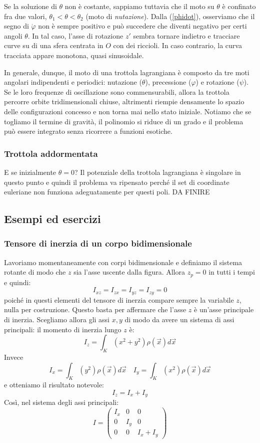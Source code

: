 \documentclass[a4paper,openany]{article}
\begin{document}
	
	Se la soluzione di $\theta$ non è costante, sappiamo tuttavia che il moto su $\theta$ è confinato fra due valori, $\theta_1<\theta <\theta_2$ (moto di \textit{nutazione}). Dalla (\ref{phidot}), osserviamo che il segno di $\dot{\varphi}$ non è sempre positivo e può succedere che diventi negativo per certi angoli $\theta$. In tal caso, l'asse di rotazione $z'$ sembra tornare indietro e tracciare curve su di una sfera centrata in $O$ con dei riccioli. In caso contrario, la curva tracciata appare monotona, quasi sinusoidale. 
	
	In generale, dunque, il moto di una trottola lagrangiana è composto da tre moti angolari indipendenti e periodici: nutazione ($\theta$), precessione ($\varphi$) e rotazione ($\psi$). Se le loro frequenze di oscillazione sono commensurabili, allora la trottola percorre orbite tridimensionali chiuse, altrimenti riempie densamente lo spazio delle configurazioni concesso e non torna mai nello stato iniziale.
	Notiamo che se togliamo il termine di gravità, il polinomio si riduce di un grado e il problema può essere integrato senza ricorrere a funzioni esotiche. 
	\subsubsection{Trottola addormentata}
	E se inizialmente $\theta = 0$? Il potenziale della trottola lagrangiana è singolare in questo punto e quindi il problema va ripensato perché il set di coordinate euleriane non funziona adeguatamente per questi poli. 
	DA FINIRE 
	\newpage 
	\subsection{Esempi ed esercizi}
	\subsubsection{Tensore di inerzia di un corpo bidimensionale}
	Lavoriamo momentaneamente con corpi bidimensionale e definiamo il sistema rotante di modo che $z$ sia l'asse uscente dalla figura. Allora $z_{p} = 0$ in tutti i tempi e quindi:
	$$
	I_{xz} = I_{zx} = I_{yz} = I_{zy} = 0
	$$  
	poiché in questi elementi del tensore di inerzia compare sempre la variabile $z$, nulla per costruzione. Questo basta per affermare che l'asse $z$ è un'asse principale di inerzia. Scegliamo allora gli assi $x,y$ di modo da avere un sistema di assi principali: il momento di inerzia lungo $z$ è:
	$$
	I_{z} = \int_{K}(x^2+y^2)\rho(\vec{x}) d\vec{x}
	$$
	Invece 
	$$
	I_{x} = \int_{K}(y^2)\rho(\vec{x}) d\vec{x} \quad I_{y} = \int_{K}(x^2)\rho(\vec{x}) d\vec{x}
	$$
	e otteniamo il risultato notevole:
	\begin{equation}\label{key}
		I_z = I_x + I_y
	\end{equation}
	Così, nel sistema degli assi principali:
	\begin{equation}\label{key}
		I = 
		\begin{pmatrix}
			I_x & 0 & 0 \\
			0 & I_y & 0 \\
			0 & 0 & I_x + I_y
		\end{pmatrix}
	\end{equation}
\end{document}
